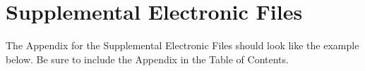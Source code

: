 \chapter{Supplemental Electronic Files}
 The Appendix for the Supplemental Electronic Files should look like the example below. Be sure to include the Appendix in the Table of Contents.